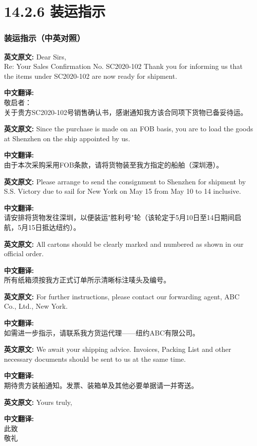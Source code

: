 \documentclass[12pt]{beamer}
\begin{document}
\section{14.2.6 装运指示}
\begin{frame}[allowframebreaks]
\frametitle{装运指示（中英对照）}
\textbf{英文原文:}
Dear Sirs,\\
Re: Your Sales Confirmation No. SC2020-102 Thank you for informing us that the items under SC2020-102 are now ready for shipment.

\smallskip
\textbf{中文翻译:}\\
敬启者：\\
关于贵方SC2020-102号销售确认书，感谢通知我方该合同项下货物已备妥待运。

\medskip
\textbf{英文原文:}
Since the purchase is made on an FOB basis, you are to load the goods at Shenzhen on the ship appointed by us.

\smallskip
\textbf{中文翻译:}\\
由于本次采购采用FOB条款，请将货物装至我方指定的船舶（深圳港）。

\medskip
\textbf{英文原文:}
Please arrange to send the consignment to Shenzhen for shipment by S.S. Victory due to sail for New York on May 15 from May 10 to 14 inclusive.

\smallskip
\textbf{中文翻译:}\\
请安排将货物发往深圳，以便装运"胜利号"轮（该轮定于5月10日至14日期间启航，5月15日抵达纽约）。

\framebreak

\textbf{英文原文:}
All cartons should be clearly marked and numbered as shown in our official order.

\smallskip
\textbf{中文翻译:}\\
所有纸箱须按我方正式订单所示清晰标注唛头及编号。

\medskip
\textbf{英文原文:}
For further instructions, please contact our forwarding agent, ABC Co., Ltd., New York.

\smallskip
\textbf{中文翻译:}\\
如需进一步指示，请联系我方货运代理——纽约ABC有限公司。

\medskip
\textbf{英文原文:}
We await your shipping advice. Invoices, Packing List and other necessary documents should be sent to us at the same time.

\smallskip
\textbf{中文翻译:}\\
期待贵方装船通知。发票、装箱单及其他必要单据请一并寄送。

\medskip
\textbf{英文原文:}
Yours truly,

\smallskip
\textbf{中文翻译:}\\
此致\\
敬礼
\end{frame}

    
\end{document}
